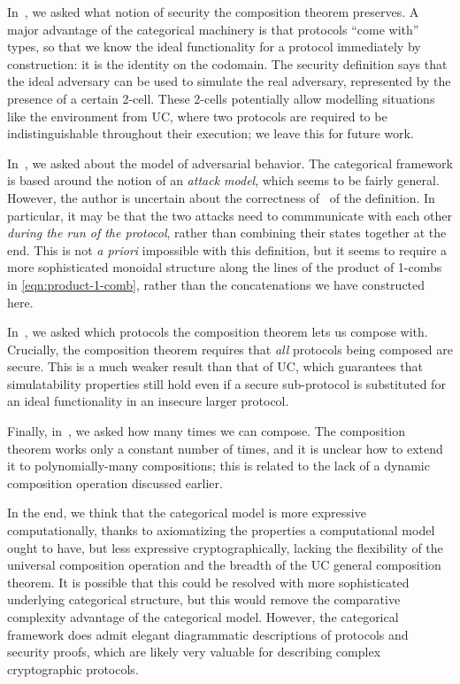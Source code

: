 In~, we asked what notion of security the
composition theorem preserves. A major advantage of the categorical machinery is
that protocols ``come with'' types, so that we know the ideal functionality for
a protocol immediately by construction: it is the identity on the codomain. The
security definition says that the ideal adversary can be used to simulate the
real adversary, represented by the presence of a certain 2-cell. These 2-cells
potentially allow modelling situations like the environment from UC, where two
protocols are required to be indistinguishable throughout their execution; we
leave this for future work.

In~, we asked about the model of adversarial
behavior. The categorical framework is based around the notion of an
\emph{attack model}, which seems to be fairly general. However, the author is
uncertain about the correctness of~ of the
definition. In particular, it may be that the two attacks need to commmunicate
with each other \emph{during the run of the protocol}, rather than combining
their states together at the end. This is not \emph{a priori} impossible with
this definition, but it seems to require a more sophisticated monoidal structure
along the lines of the product of 1-combs in
\eqref{eqn:product-1-comb}, rather than the concatenations we
have constructed here.

In~, we asked which protocols the composition
theorem lets us compose with. Crucially, the composition theorem requires that
\emph{all} protocols being composed are secure. This is a much weaker result
than that of UC, which guarantees that simulatability properties still hold even
if a secure sub-protocol is substituted for an ideal functionality in an
insecure larger protocol.

Finally, in~, we asked how many times we can
compose. The composition theorem works only a constant number of times, and it
is unclear how to extend it to polynomially-many compositions; this is related
to the lack of a dynamic composition operation discussed earlier.

In the end, we think that the categorical model is more expressive
computationally, thanks to axiomatizing the properties a computational model
ought to have, but less expressive cryptographically, lacking the flexibility of
the universal composition operation and the breadth of the UC general
composition theorem. It is possible that this could be resolved with more
sophisticated underlying categorical structure, but this would remove the
comparative complexity advantage of the categorical model. However, the
categorical framework does admit elegant diagrammatic descriptions of protocols
and security proofs, which are likely very valuable for describing complex
cryptographic protocols.

